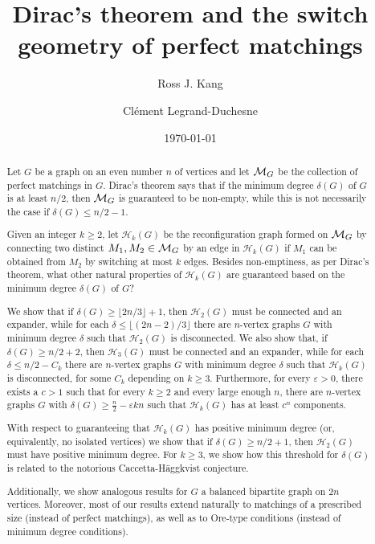 \documentclass[11pt,a4paper]{article}
\title{Dirac's theorem and the switch geometry of perfect matchings}
\author{Ross J. Kang\footnotemark[1] \and Clément Legrand-Duchesne\footnotemark[2]}
\date{\today}
\theoremstyle{definition}
\newcommand{\eps}{\varepsilon}
\begin{document}
\maketitle
\renewcommand{\thefootnote}{\fnsymbol{footnote}} %

\renewcommand{\thefootnote}{\arabic{footnote}} %

\begin{abstract}
Let $G$ be a graph on an even number $n$ of vertices and let ${\cal M}_G$ be the
collection of perfect matchings in $G$. Dirac's theorem says that if the minimum
degree $\delta(G)$ of $G$ is at least $n/2$, then ${\cal M}_G$ is guaranteed to
be non-empty, while this is not necessarily the case if $\delta(G) \le n/2-1$.

Given an integer $k\ge 2$, let $\mathcal H_k(G)$ be the reconfiguration graph
formed on ${\cal M}_G$ by connecting two distinct $M_1,M_2\in {\cal M}_G$ by an
edge in $\mathcal H_k(G)$ if $M_1$ can be obtained from $M_2$ by switching at most $k$ edges.
Besides non-emptiness, as per Dirac's theorem, what  other natural properties of $\mathcal H_k(G)$ are guaranteed based on the minimum degree $\delta(G)$ of $G$?

We show that if $\delta(G) \ge \lfloor2n/3\rfloor+1$, then $\mathcal H_2(G)$ must be connected and an
expander, while for each $\delta\le \lfloor(2n-2)/3\rfloor$ there are $n$-vertex graphs
$G$ with minimum degree $\delta$ such that $\mathcal H_2(G)$ is disconnected. We also show that, if $\delta(G)
\ge n/2+2$, then $\mathcal H_3(G)$ must be connected and an expander, while for each
$\delta\le n/2-C_k$ there are $n$-vertex graphs $G$ with minimum degree $\delta$ such that $\mathcal H_k(G)$ is
disconnected, for some $C_k$ depending on $k\ge 3$.  Furthermore, for every $\eps >0$, there exists a $c>1$ such that for every
$k\ge 2$ and every large enough $n$, there are $n$-vertex graphs $G$ with $\delta(G) \ge \frac{n}2-\eps kn$ such that $\mathcal H_k(G)$
has at least $c^n$ components.

With respect to guaranteeing that $\mathcal H_k(G)$ has positive minimum degree (or, equivalently, no isolated vertices) we show that if $\delta(G) \ge
n/2+1$, then $\mathcal H_2(G)$ must have positive minimum degree. For $k\ge 3$, we show how this threshold for $\delta(G)$ is related to the notorious Caccetta-Häggkvist conjecture.

Additionally, we show analogous results for $G$ a balanced bipartite graph on $2n$
vertices.
Moreover, most of our results extend naturally to matchings of a prescribed size (instead of perfect matchings), as well as to Ore-type conditions (instead of minimum degree conditions).
\end{abstract}
\end{document}
